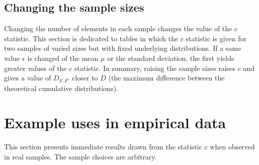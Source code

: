 \documentclass[%
	aip,
	jmp,%
	amsmath,amssymb,
	reprint,%
]{revtex4-1}
\begin{document}






%
%



\FloatBarrier

\subsection{Changing the sample sizes}
Changing the number of elements in each sample
changes the value of the $c$ statistic.
This section is dedicated to tables in which
the $c$ statistic is given for two samples of varied sizes but
with fixed underlying distributions.
If a same value $\epsilon$ is changed of the mean $\mu$ or
the standard deviation, the first yields greater
values of the $c$ statistic.
In summary, raising the sample sizes raises $c$ and gives a value
of $D_{F,F'}$ closer to $D$ (the maximum difference between the theoretical cumulative distributions).









\FloatBarrier
\section{Example uses in empirical data}\label{sec:empirical}

This section presents immediate results
drawn from the statistic $c$ when observed
in real samples.
The sample choices are arbitrary.
\end{document}
